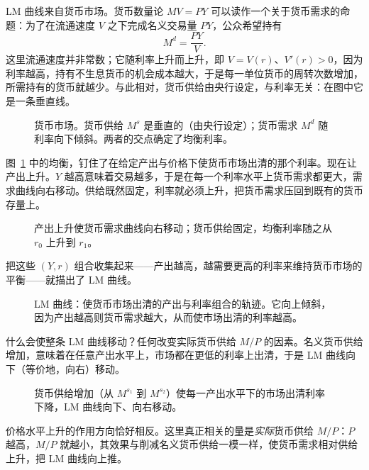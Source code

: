 LM 曲线来自货币市场。货币数量论 $MV = PY$ 可以读作一个关于货币需求的命题：为了在流通速度 $V$ 之下完成名义交易量 $PY$，公众希望持有
\[
M^{d} = \frac{PY}{V}.
\]
这里流通速度并非常数；它随利率上升而上升，即 $V=V(r)$、$V'(r)>0$，因为利率越高，持有不生息货币的机会成本越大，于是每一单位货币的周转次数增加，所需持有的货币就越少。与此相对，货币供给由央行设定，与利率无关：在图中它是一条垂直线。

\begin{figure}[h]
\centering

\caption{货币市场。货币供给 $M^{s}$ 是垂直的（由央行设定）；货币需求 $M^{d}$ 随利率向下倾斜。两者的交点确定了均衡利率。}
\label{fig:macro-16}
\end{figure}

图~\ref{fig:macro-16} 中的均衡，钉住了在给定产出与价格下使货币市场出清的那个利率。现在让产出上升。$Y$ 越高意味着交易越多，于是在每一个利率水平上货币需求都更大，需求曲线向右移动。供给既然固定，利率就必须上升，把货币需求压回到既有的货币存量上。

\begin{figure}[h]
\centering

\caption{产出上升使货币需求曲线向右移动；货币供给固定，均衡利率随之从 $r_0$ 上升到 $r_1$。}
\label{fig:macro-17}
\end{figure}

把这些 $(Y,r)$ 组合收集起来——产出越高，越需要更高的利率来维持货币市场的平衡——就描出了 LM 曲线。

\begin{figure}[h]
\centering

\caption{LM 曲线：使货币市场出清的产出与利率组合的轨迹。它向上倾斜，因为产出越高则货币需求越大，从而使市场出清的利率越高。}
\label{fig:macro-18}
\end{figure}


什么会使整条 LM 曲线移动？任何改变实际货币供给 $M/P$ 的因素。名义货币供给增加，意味着在任意产出水平上，市场都在更低的利率上出清，于是 LM 曲线向下（等价地，向右）移动。

\begin{figure}[h]
\centering

\caption{货币供给增加（从 $M^{s_1}$ 到 $M^{s_2}$）使每一产出水平下的市场出清利率下降，LM 曲线向下、向右移动。}
\label{fig:macro-19}
\end{figure}

价格水平上升的作用方向恰好相反。这里真正相关的量是\emph{实际}货币供给 $M/P$：$P$ 越高，$M/P$ 就越小，其效果与削减名义货币供给一模一样，使货币需求相对供给上升，把 LM 曲线向上推。

